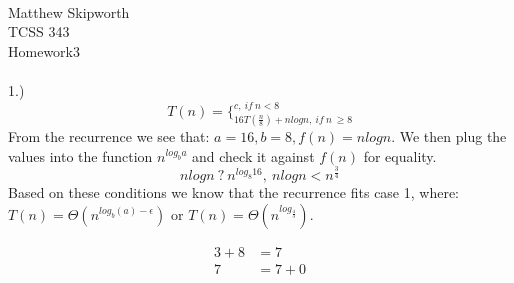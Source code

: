 \documentclass[page=4,11pt]{article}
\begin{document}
\ \\
Matthew Skipworth\\
TCSS 343\\
Homework3\\ \\
1.) $$T(n)= \Bigg\{^{c,\ if\ n<8}_{16T(\frac{n}{8})+nlogn,\ if\ n\ \geq 8}$$
From the recurrence we see that: $a=16, b=8, f(n)=nlogn$.
We then plug the values into the function $n^{log_{b}a}$ and check
it against $f(n)$ for equality.
$$nlogn\ ?\ n^{log_{8}16},\ nlogn<n^{\frac{3}{4}}$$
Based on these conditions we know that the recurrence fits case 1, 
where: $T(n)= \Theta(n^{log_{b}(a)-\epsilon})$ or $T(n)=  \Theta(n^{log_{\frac{4}{3}}})$.

\begin{align*}
3+8&=7\\
7&=7+0
\end{align*}
\end{document}
